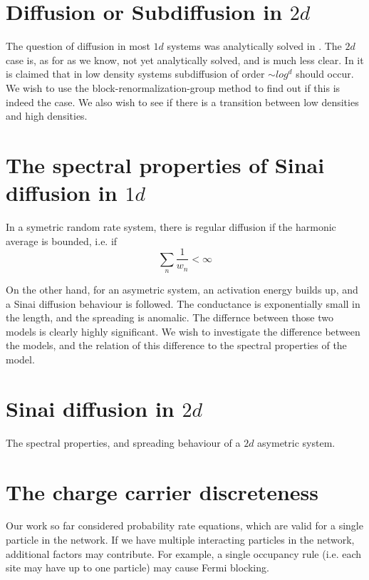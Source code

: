 \section{Diffusion or Subdiffusion in $2d$}

The question of diffusion in most $1d$ systems was analytically solved in \cite{Alexander:1981:RMP}. The $2d$ case is, as for as we know, not yet analytically solved, and is much less clear. In \cite{Amir:2010:PRL} it is claimed that in low density systems subdiffusion of order $\sim log^d$ should occur. We wish to use the block-renormalization-group method to find out if this is indeed the case. We also wish to see if there is a transition between low densities and high densities.



\section{The spectral properties of Sinai diffusion in $1d$}

In a symetric random rate system, there is regular diffusion if the harmonic average is bounded, i.e. if
\[ \sum_n \frac{1}{w_n} < \infty \]

On the other hand, for an asymetric system, an activation energy builds up, and a Sinai diffusion behaviour is followed.
The conductance is exponentially small in the length, and the spreading is anomalic. The differnce between those two models is clearly highly significant. We wish to investigate the difference between the models, and the relation of this difference to the spectral properties of the model.

\section{Sinai diffusion in $2d$}

The spectral properties, and spreading behaviour of a $2d$ asymetric system.


\section{The charge carrier discreteness}

Our work so far considered probability rate equations, which are valid for a single particle in the network.
If we have multiple interacting particles in the network, additional factors may contribute. For example,
a single occupancy rule (i.e. each site may have up to one particle) may cause Fermi blocking.

